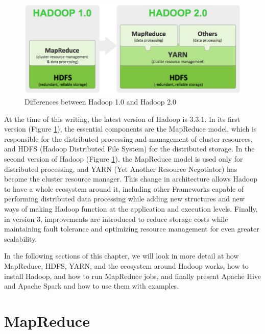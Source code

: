 \documentclass[12pt,english]{book}
\begin{document}
\begin{figure}[ht]
\centering
\includegraphics[width=\linewidth]{hadoop1vshadoop2.png}
\caption[Differences between Hadoop 1.0 and Hadoop 2.0]{Differences between Hadoop 1.0 and Hadoop 2.0 \footnotemark}
\label{fig:differenceBetweenHadoop1and2}
\end{figure}

At the time of this writing, the latest version of Hadoop is 3.3.1.
In its first version (Figure \ref{fig:differenceBetweenHadoop1and2}), the essential components are the MapReduce model, which is responsible for the distributed processing and management of cluster resources, and HDFS (Hadoop Distributed File System) for the distributed storage.
In the second version of Hadoop (Figure \ref{fig:differenceBetweenHadoop1and2}), the MapReduce model is used only for distributed processing, and YARN (Yet Another Resource Negotiator) has become the cluster resource manager.
This change in architecture allows Hadoop to have a whole ecosystem around it, including other Frameworks capable of performing distributed data processing while adding new structures and new ways of making Hadoop function at the application and execution levels.
Finally, in version 3, improvements are introduced to reduce storage costs while maintaining fault tolerance and optimizing resource management for even greater scalability.

In the following sections of this chapter, we will look in more detail at how MapReduce, HDFS, YARN, and the ecosystem around Hadoop works, how to install Hadoop, and how to run MapReduce jobs, and finally present Apache Hive and Apache Spark and how to use them with examples.


\section{MapReduce}
\end{document}
